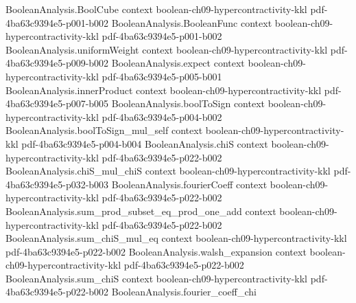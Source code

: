 \begin{theorem}
\leanok
{}
\label{BooleanAnalysis.Hypercontractivity.one_bit_2q_hypercontractivity}
\proofstep
  {BooleanAnalysis.BoolCube}
  {context}
  {boolean-ch09-hypercontractivity-kkl}
  {pdf-4ba63c9394e5-p001-b002}
\proofstep
  {BooleanAnalysis.BooleanFunc}
  {context}
  {boolean-ch09-hypercontractivity-kkl}
  {pdf-4ba63c9394e5-p001-b002}
\proofstep
  {BooleanAnalysis.uniformWeight}
  {context}
  {boolean-ch09-hypercontractivity-kkl}
  {pdf-4ba63c9394e5-p009-b002}
\proofstep
  {BooleanAnalysis.expect}
  {context}
  {boolean-ch09-hypercontractivity-kkl}
  {pdf-4ba63c9394e5-p005-b001}
\proofstep
  {BooleanAnalysis.innerProduct}
  {context}
  {boolean-ch09-hypercontractivity-kkl}
  {pdf-4ba63c9394e5-p007-b005}
\proofstep
  {BooleanAnalysis.boolToSign}
  {context}
  {boolean-ch09-hypercontractivity-kkl}
  {pdf-4ba63c9394e5-p004-b002}
\proofstep
  {BooleanAnalysis.boolToSign_mul_self}
  {context}
  {boolean-ch09-hypercontractivity-kkl}
  {pdf-4ba63c9394e5-p004-b004}
\proofstep
  {BooleanAnalysis.chiS}
  {context}
  {boolean-ch09-hypercontractivity-kkl}
  {pdf-4ba63c9394e5-p022-b002}
\proofstep
  {BooleanAnalysis.chiS_mul_chiS}
  {context}
  {boolean-ch09-hypercontractivity-kkl}
  {pdf-4ba63c9394e5-p032-b003}
\proofstep
  {BooleanAnalysis.fourierCoeff}
  {context}
  {boolean-ch09-hypercontractivity-kkl}
  {pdf-4ba63c9394e5-p022-b002}
\proofstep
  {BooleanAnalysis.sum_prod_subset_eq_prod_one_add}
  {context}
  {boolean-ch09-hypercontractivity-kkl}
  {pdf-4ba63c9394e5-p022-b002}
\proofstep
  {BooleanAnalysis.sum_chiS_mul_eq}
  {context}
  {boolean-ch09-hypercontractivity-kkl}
  {pdf-4ba63c9394e5-p022-b002}
\proofstep
  {BooleanAnalysis.walsh_expansion}
  {context}
  {boolean-ch09-hypercontractivity-kkl}
  {pdf-4ba63c9394e5-p022-b002}
\proofstep
  {BooleanAnalysis.sum_chiS}
  {context}
  {boolean-ch09-hypercontractivity-kkl}
  {pdf-4ba63c9394e5-p022-b002}
\proofstep
  {BooleanAnalysis.fourier_coeff_chi}

\end{theorem}
